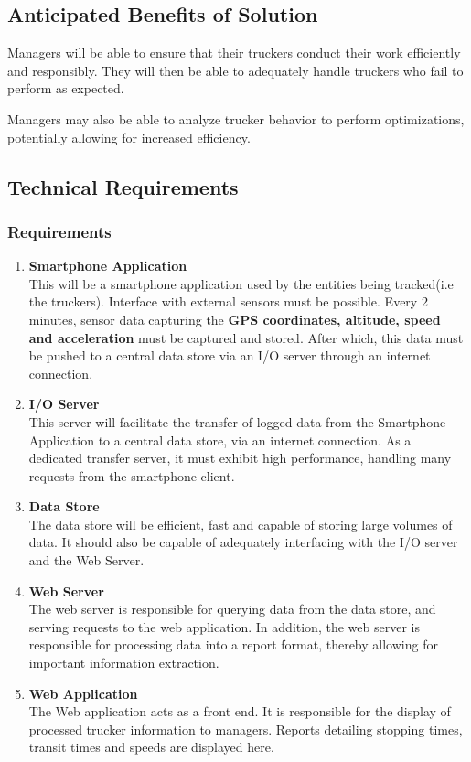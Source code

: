 \subsection{Anticipated Benefits of Solution}
Managers will be able to ensure that their truckers conduct their work efficiently and responsibly.
They will then be able to adequately handle truckers who fail to perform as expected.

Managers may also be able to analyze trucker behavior to perform optimizations, potentially allowing for increased efficiency.

\subsection{Technical Requirements}
\subsubsection{Requirements}
\begin{enumerate}
\item \textbf{Smartphone Application}\\
This will be a smartphone application used by the entities being tracked(i.e the truckers).
Interface with external sensors must be possible.
Every 2 minutes, sensor data capturing the \textbf{GPS coordinates, altitude, speed and acceleration} must be captured and stored. After which, this data must be pushed to a central data store via an I/O server through an internet connection.
\item \textbf{I/O Server}\\
This server will facilitate the transfer of logged data from the Smartphone Application to a central data store, via an internet connection. As a dedicated transfer server, it must exhibit high performance, handling many requests from the smartphone client.
\item \textbf{Data Store}\\
The data store will be efficient, fast and capable of storing large volumes of data.
It should also be capable of adequately interfacing with the I/O server and the Web Server.
\item \textbf{Web Server}\\
The web server is responsible for querying data from the data store, and serving requests to the web application.
In addition, the web server is responsible for processing data into a report format, thereby allowing for important information extraction.
\item \textbf{Web Application}\\
The Web application acts as a front end.
It is responsible for the display of processed trucker information to managers.
Reports detailing stopping times, transit times and speeds are displayed here.
\end{enumerate}
